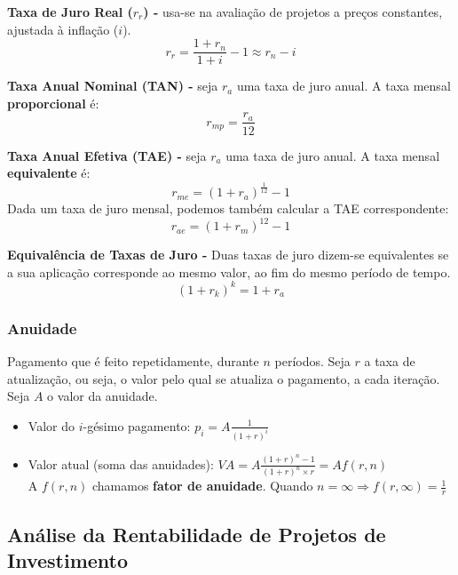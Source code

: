 \documentclass[11pt]{article}
\begin{document}
\textbf{Taxa de Juro Real ($r_r$) -} usa-se na avaliação de projetos a preços constantes, ajustada à inflação ($i$).
\begin{equation*}
    r_r = \frac{1+r_n}{1+i} - 1 \approx r_n - i
\end{equation*}

\textbf{Taxa Anual Nominal (TAN) -} seja $r_a$ uma taxa de juro anual. A taxa mensal \textbf{proporcional} é:
\begin{equation*}
    r_{mp} = \frac{r_a}{12}
\end{equation*}

\textbf{Taxa Anual Efetiva (TAE) -} seja $r_a$ uma taxa de juro anual. A taxa mensal \textbf{equivalente} é:
\begin{equation*}
    \displaystyle r_{me} = (1+r_a)^{\frac{1}{12}} - 1
\end{equation*}
Dada um taxa de juro mensal, podemos também calcular a TAE correspondente:
\begin{equation*}
    \displaystyle r_{ae} = (1+r_m)^{12} - 1
\end{equation*}

\textbf{Equivalência de Taxas de Juro -} Duas taxas de juro dizem-se equivalentes se a sua aplicação corresponde ao mesmo valor, ao fim do mesmo período de tempo.
\begin{equation*}
    (1+r_k)^k = 1 + r_a
\end{equation*}

\subsubsection{Anuidade}

Pagamento que é feito repetidamente, durante $n$ períodos. Seja $r$ a taxa de atualização, ou seja, o valor pelo qual se atualiza o pagamento, a cada iteração. Seja $A$ o valor da anuidade.
\begin{itemize}[topsep=0pt]
    \item Valor do $i$-gésimo pagamento: $\displaystyle p_i=A\frac{1}{(1+r)^i}$
    \item Valor atual (soma das anuidades): $\displaystyle VA=A\frac{(1+r)^n-1}{(1+r)^n\times r}=Af(r,n)$\\[6pt]
          A $f(r,n)$ chamamos \textbf{fator de anuidade}. Quando $\displaystyle n = \infty \Rightarrow f(r,\infty)=\frac{1}{r}$
\end{itemize}

\subsection{Análise da Rentabilidade de Projetos de Investimento}
\end{document}
